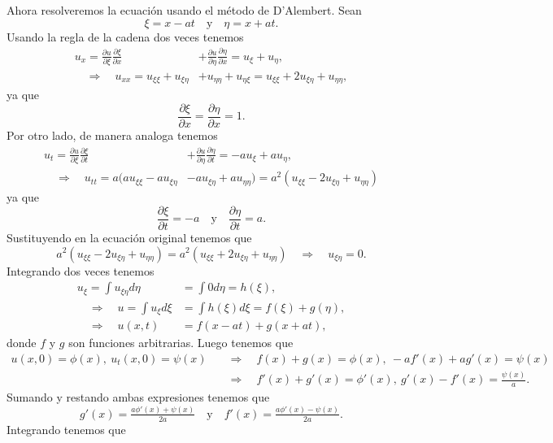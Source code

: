 \documentclass[12pt]{article}
\newcommand{\Text}[1]{\quad\text{#1}\quad}
\newcommand{\Imp}{\quad\Longrightarrow\quad}
\begin{document}
\begin{enumerate}
\begin{enumerate}
            Ahora resolveremos la ecuación usando el método de D'Alembert. Sean
            \[ \xi = x-at\Text{y}\eta=x+at. \]
            Usando la regla de la cadena dos veces tenemos
            \begin{align*}
                u_x =\frac{\partial u}{\partial\xi}\frac{\partial\xi}{\partial x}&+\frac{\partial u}{\partial\eta}\frac{\partial\eta}{\partial x}=u_\xi+u_\eta,\\
                \Imp u_{xx} =u_{\xi\xi}+u_{\xi\eta}&+u_{\eta\eta}+u_{\eta\xi}=u_{\xi\xi}+2u_{\xi\eta}+u_{\eta\eta},
            \end{align*}
            ya que
            \[ \frac{\partial\xi}{\partial x}=\frac{\partial\eta}{\partial x}=1. \]
            Por otro lado, de manera analoga tenemos
            \begin{align*}
                u_t = \frac{\partial u}{\partial\xi}\frac{\partial\xi}{\partial t}&+\frac{\partial u}{\partial\eta}\frac{\partial\eta}{\partial t}=-au_\xi+au_\eta,\\
                \Imp u_{tt} = a(au_{\xi\xi}-au_{\xi\eta}&-au_{\xi\eta}+au_{\eta\eta}) = a^2(u_{\xi\xi}-2u_{\xi\eta}+u_{\eta\eta}) 
            \end{align*}
            ya que
            \[ \frac{\partial\xi}{\partial t}=-a\Text{y} \frac{\partial\eta}{\partial t}=a. \]
            Sustituyendo en la ecuación original tenemos que
            \[ a^2(u_{\xi\xi}-2u_{\xi\eta}+u_{\eta\eta}) = a^2(u_{\xi\xi}+2u_{\xi\eta}+u_{\eta\eta})\Imp u_{\xi\eta}=0. \]
            Integrando dos veces tenemos
            \begin{align*}
                u_\xi = \int u_{\xi\eta}d\eta&= \int 0d\eta=h(\xi),\\
                \Imp u= \int u_\xi d\xi &= \int h(\xi) d\xi=f(\xi)+g(\eta),\\
                \Imp u(x,t)&=f(x-at)+g(x+at),
            \end{align*}
            donde $f$ y $g$ son funciones arbitrarias. Luego tenemos que
            \begin{align*}
                u(x, 0)=\phi(x),~u_t(x,0)=\psi(x) &\Imp f(x)+g(x)=\phi(x),~ -af'(x)+ag'(x)=\psi(x)\\
                &\Imp f'(x)+g'(x)=\phi'(x),~ g'(x)-f'(x)=\tfrac{\psi(x)}{a}.
            \end{align*}
            Sumando y restando ambas expresiones tenemos que
            \[ g'(x)=\tfrac{a\phi'(x)+\psi(x)}{2a}\Text{y} f'(x)= \tfrac{a\phi'(x)-\psi(x)}{2a}. \]
            Integrando tenemos que

\end{enumerate}
\end{enumerate}
\end{document}
